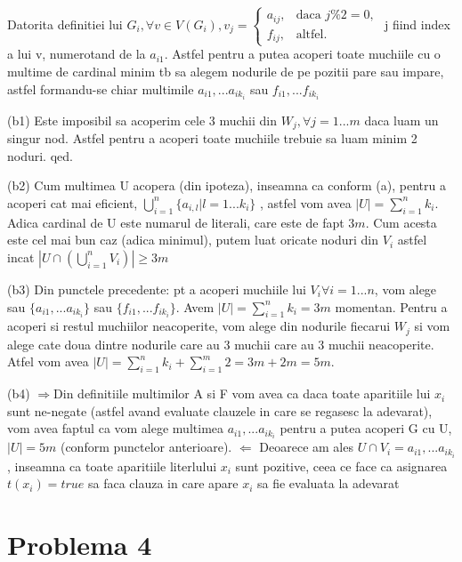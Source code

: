 \documentclass{article}
\begin{document}
Datorita definitiei lui $G_i, \forall v \in V(G_i), v_j = 
  \begin{cases}
	a_{ij}, & \text{daca } j \%2 =0, \\
  	f_{ij}, & \text{altfel}.
  \end{cases}
$
j fiind index a lui v, numerotand de la $a_{i1}$. Astfel pentru a putea acoperi toate muchiile cu o multime de cardinal minim tb sa alegem nodurile de pe pozitii pare sau impare, astfel formandu-se chiar multimile ${a_{i1}, ... a_{ik_i}}$ sau ${f_{i1}, ... f_{ik_i}}$

(b1) Este imposibil sa acoperim cele 3 muchii din $W_j , \forall j = 1...m$ daca luam
un singur nod. Astfel pentru a acoperi toate muchiile trebuie sa luam minim 2
noduri. qed.

(b2) Cum multimea U acopera (din ipoteza), inseamna ca conform (a), pentru a acoperi
cat mai eficient, $\bigcup_{i=1}^{n}{\{a_{i,l}|l=1...k_i\}}$ , astfel vom avea $|U| = \sum_{i=1}^{n}{k_i}$.
Adica cardinal de U este numarul de literali, care este de fapt $3m$. Cum acesta este
cel mai bun caz (adica minimul), putem luat oricate noduri din $V_i$ astfel incat
$|U \cap (\bigcup_{i=1}^{n}{V_i})| \geq 3m$

(b3) Din punctele precedente: pt a acoperi muchiile lui $V_i \forall i = 1...n$, vom
alege sau $\{a_{i1}, ... a_{ik_i}\}$ sau $\{f_{i1}, ... f_{ik_i}\}$. Avem 
$|U| = \sum_{i=1}^{n}{k_i} = 3m $
momentan. Pentru a acoperi si restul muchiilor neacoperite, vom alege din
nodurile fiecarui $W_j$ si vom alege cate doua dintre nodurile care au 3 muchii
care au 3 muchii neacoperite. Atfel vom avea 
$|U| = \sum_{i=1}^{n}{k_i} + \sum_{i=1}^{m}{2} = 3m + 2m = 5m$.

(b4) $\Rightarrow $Din definitiile multimilor A si F vom avea ca daca toate aparitiile lui
$x_i$ sunt ne-negate (astfel avand evaluate clauzele in care se regasesc la adevarat),
vom avea faptul ca vom alege multimea ${a_{i1}, ... a_{ik_i}}$  pentru a putea acoperi
G cu U, $|U| = 5m$ (conform punctelor anterioare). $\Leftarrow$ Deoarece am ales $U \cap V_i =
{a_{i1}, ... a_{ik_i}}$, inseamna ca toate aparitiile literlului $x_i$ sunt pozitive, ceea ce
face ca asignarea $t(x_i) = true$ sa faca clauza in care apare $x_i$ sa fie evaluata la
adevarat


\section*{Problema 4}
\end{document}
